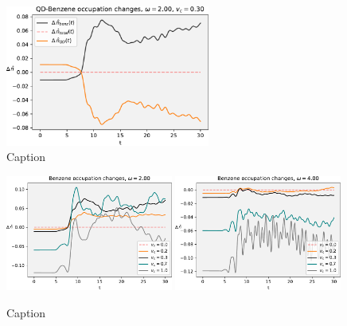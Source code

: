 \begin{figure}[!hbt]
    \centering
    \includegraphics[width=0.6\textwidth]{graph/occupation/occupation_w2_03_sum.pdf}
    \caption{Caption}
    \label{fig:}
\end{figure}

\begin{figure}[!hbt]
    \centering
    \includegraphics[width=0.49\textwidth]{graph/occupation/occupation_w2_Benz_sum_vcsweep.pdf}
    \includegraphics[width=0.49\textwidth]{graph/occupation/occupation_w4_Benz_sum_vcsweep.pdf}
    \caption{Caption}
    \label{fig:}
\end{figure}


